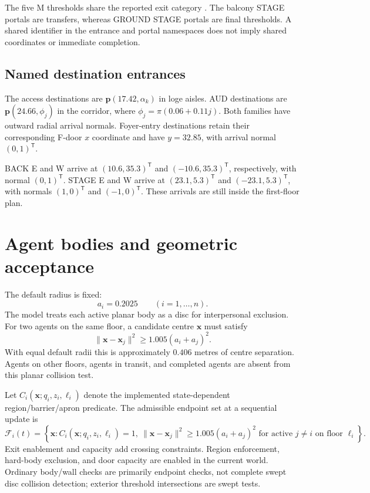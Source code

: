 \documentclass[11pt]{article}
\newcommand{\code}[1]{\texttt{\detokenize{#1}}}
\begin{document}
The five M thresholds share the reported exit category \code{MAIN}. The
balcony STAGE portals are transfers, whereas GROUND STAGE portals are final
thresholds. A shared identifier in the entrance and portal namespaces does
not imply shared coordinates or immediate completion.

\subsection{Named destination entrances}

The access destinations are $\mathbf p(17.42,\alpha_k)$ in loge aisles.
AUD destinations are $\mathbf p(24.66,\phi_j)$ in the corridor, where
$\phi_j=\pi(0.06+0.11j)$. Both families have outward radial arrival normals.
Foyer-entry destinations retain their corresponding F-door $x$ coordinate
and have $y=32.85$, with arrival normal $(0,1)^{\mathsf T}$.

BACK E and W arrive at $(10.6,35.3)^{\mathsf T}$ and
$(-10.6,35.3)^{\mathsf T}$, respectively, with normal $(0,1)^{\mathsf T}$.
STAGE E and W arrive at $(23.1,5.3)^{\mathsf T}$ and
$(-23.1,5.3)^{\mathsf T}$, with normals $(1,0)^{\mathsf T}$ and
$(-1,0)^{\mathsf T}$. These arrivals are still inside the first-floor plan.

\section{Agent bodies and geometric acceptance}

The default radius is fixed:
\[
 a_i=0.2025\qquad(i=1,\ldots,n).
\]
The model treats each active planar body as a disc for interpersonal exclusion.
For two agents on the same floor, a candidate centre $\mathbf x$ must satisfy
\[
 \|\mathbf x-\mathbf x_j\|^2\geq1.005(a_i+a_j)^2.
\]
With equal default radii this is approximately $0.406$ metres of centre
separation. Agents on other floors, agents in transit, and completed agents
are absent from this planar collision test.

Let $C_i(\mathbf x;q_i,z_i,\ell_i)$ denote the implemented state-dependent
region/barrier/apron predicate. The admissible endpoint set at a sequential
update is
\[
 \mathcal F_i(t)=\left\{\mathbf x:C_i(\mathbf x;q_i,z_i,\ell_i)=1,
 \ \|\mathbf x-\mathbf x_j\|^2\geq1.005(a_i+a_j)^2
 \text{ for active }j\ne i\text{ on floor }\ell_i\right\}.
\]
Exit enablement and capacity add crossing constraints. Region enforcement,
hard-body exclusion, and door capacity are enabled in the current world.
Ordinary body/wall checks are primarily endpoint checks, not complete swept
disc collision detection; exterior threshold intersections are swept tests.
\end{document}
